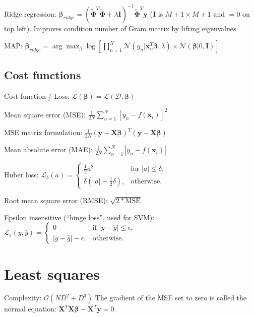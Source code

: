 \documentclass[10pt,a4paper,landscape]{article}
\renewcommand{\bf}[1]{\ensuremath{\mathbf{#1}}}
\newcommand{\bbeta}{\boldsymbol\beta}
\begin{document}
\begin{multicols*}{4}
Ridge regression: $\bbeta_{ridge} = ( \tilde{\boldsymbol\Phi}^T \tilde{\boldsymbol\Phi} + \lambda \boldsymbol I)^{-1} \tilde{\boldsymbol\Phi}^T \boldsymbol y$ ($\boldsymbol I$ is $M+1 \times M+1$ and $=0$ on top left). Improves condition number of Gram matrix by lifting eigenvalues.

MAP: $\bbeta_{ridge} = \arg \max_\beta \log[\prod\limits_{n=1}^N \mathcal{N}(y_n | \bf{x}_n^T\bbeta, \lambda) \times \mathcal{N}(\bbeta|0,\bf{I})]$

\subsection{Cost functions}

Cost function / Loss: $\mathcal{L}(\bbeta) = \mathcal{L}(\mathcal{D},\bbeta)$

Mean square error (MSE): $\frac{1}{2N} \sum_{n=1}^{N}\left[y_n-f(\bf{x}_i) \right]^2$

MSE matrix formulation: $\frac{1}{2N} (\bf{y - X \bbeta})^T (\bf{y - X \bbeta})$

Mean absolute error (MAE): $\frac{1}{2N} \sum_{n=1}^{N}\left | y_n-f(\bf{x}_i) \right |$

Huber loss: $\mathcal{L}_\delta (a) = \begin{cases}
\frac{1}{2}{a^2}                   & \text{for } |a| \le \delta, \\
\delta (|a| - \frac{1}{2}\delta ), & \text{otherwise.}
\end{cases}$

Root mean square error (RMSE): $\sqrt{2 * \text{MSE}}$

Epsilon insensitive (``hinge loss'', used for SVM):
$\mathcal{L}_{\epsilon}(y, \hat{y}) = \begin{cases}
0                   & \text{if } |y - \hat y| \le \epsilon, \\
|y - \hat y| - \epsilon, & \text{otherwise.}
\end{cases}$

\section{Least squares}
Complexity: $\mathcal{O}(ND^2 + D^3)$
The gradient of the MSE set to zero is called the normal equation:
$  \bf{X}^T \bf{X} \bbeta - \bf{X}^T \bf{y} = 0$.


\end{multicols*}
\end{document}
